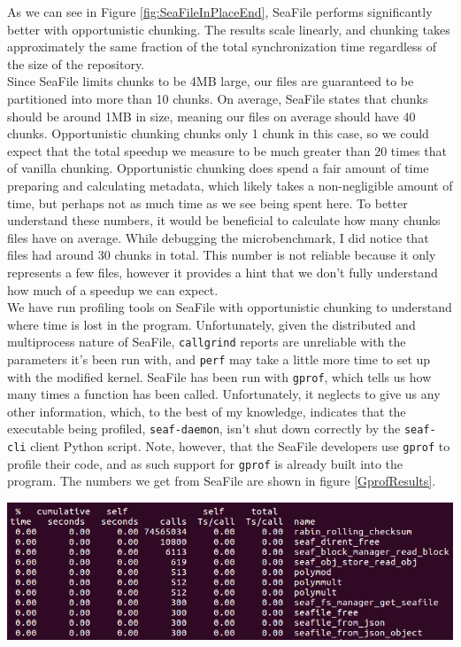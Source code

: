 \documentclass[table]{article}
\newenvironment{Figure}
  {\par\medskip\noindent\minipage{\linewidth}}
  {\endminipage\par\medskip}
\newcommand{\code}[1]{\texttt{#1}}
\begin{document}
\begin{multicols}{2}
As we can see in Figure \ref{fig:SeaFileInPlaceEnd}, SeaFile performs significantly better with opportunistic chunking. The results scale linearly, and chunking takes approximately the same fraction of the total synchronization time regardless of the size of the repository.\\

Since SeaFile limits chunks to be 4MB large, our files are guaranteed to be partitioned into more than 10 chunks. On average, SeaFile states that chunks should be around 1MB in size\cite{SeaFile-data-model}, meaning our files on average should have 40 chunks. Opportunistic chunking chunks only 1 chunk in this case, so we could expect that the total speedup we measure to be much greater than 20 times that of vanilla chunking. Opportunistic chunking does spend a fair amount of time preparing and calculating metadata, which likely takes a non-negligible amount of time, but perhaps not as much time as we see being spent here. To better understand these numbers, it would be beneficial to calculate how many chunks files have on average. While debugging the microbenchmark, I did notice that files had around 30 chunks in total. This number is not reliable because it only represents a few files, however it provides a hint that we don't fully understand how much of a speedup we can expect.\\

We have run profiling tools on SeaFile with opportunistic chunking to understand where time is lost in the program. Unfortunately, given the distributed and multiprocess nature of SeaFile, \code{callgrind} reports are unreliable with the parameters it's been run with, and \code{perf} may take a little more time to set up with the modified kernel. SeaFile has been run with \code{gprof}, which tells us how many times a function has been called. Unfortunately, it neglects to give us any other information, which, to the best of my knowledge, indicates that the executable being profiled, \code{seaf-daemon}, isn't shut down correctly by the \code{seaf-cli} client Python script. Note, however, that the SeaFile developers use \code{gprof} to profile their code, and as such support for \code{gprof} is already built into the program. The numbers we get from SeaFile are shown in figure \ref{GprofResults}.

\begin{Figure}
 \centering
 \includegraphics[width=\linewidth]{results_gprof.png}
 \label{fig:GprofResults}
\end{Figure}


\end{multicols}
\end{document}
